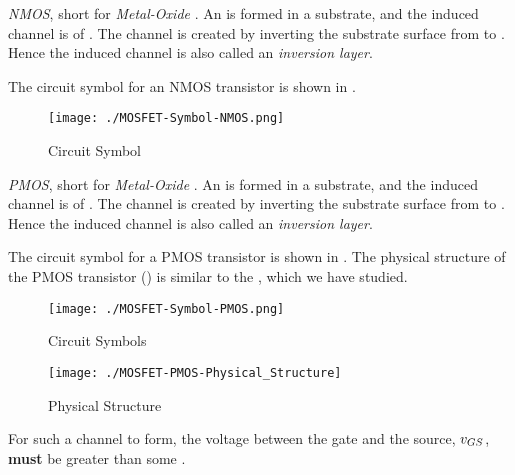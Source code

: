 \begin{definition}[NMOS]\label{def:NMOS}
  \emph{NMOS}, short for \emph{ Metal-Oxide }.
  An   is formed in a \PType{} substrate, and the induced channel is of \PType{}.
  The channel is created by inverting the substrate surface from \PType{} to \NType{}.
  Hence the induced channel is also called an \emph{inversion layer}.

  The circuit symbol for an NMOS transistor is shown in .
\end{definition}

\begin{figure}[h!tbp]
  \centering
  \texttt{[image: ./MOSFET-Symbol-NMOS.png]}
  \caption{  Circuit Symbol \parencite[p.~265]{sedraTextbook7}}
  \label{fig:MOSFET-Symbol-NMOS}
\end{figure}

\begin{definition}[PMOS]\label{def:PMOS}
  \emph{PMOS}, short for \emph{ Metal-Oxide }.
  An   is formed in a \NType{} substrate, and the induced channel is of \PType{}.
  The channel is created by inverting the substrate surface from \NType{} to \PType{}.
  Hence the induced channel is also called an \emph{inversion layer}.

  The circuit symbol for a PMOS transistor is shown in .
  The physical structure of the PMOS transistor () is similar to the , which we have studied.
\end{definition}

\begin{figure}[h!tbp]
  \centering
  \texttt{[image: ./MOSFET-Symbol-PMOS.png]}
  \caption{  Circuit Symbols \parencite[p.274]{sedraTextbook7}}
  \label{fig:MOSFET-Symbol-PMOS}
\end{figure}

\begin{figure}[h!tbp]
  \centering
  \texttt{[image: ./MOSFET-PMOS-Physical\_Structure]}
  \caption{ Physical Structure \parencite[p.~262]{sedraTextbook7}}
  \label{fig:MOSFET-Physical_Structure-PMOS}
\end{figure}

For such a channel to form, the voltage between the gate and the source, $v_{GS}$, \textbf{must} be greater than some .

